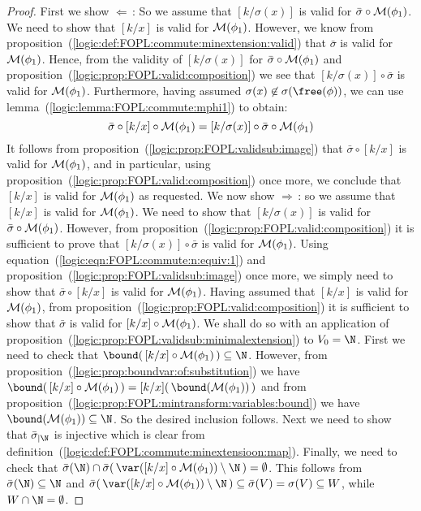 \begin{proof}
First we show $\Leftarrow$\,: So we assume that $[k/\sigma(x)]$ is
valid for $\bar{\sigma}\circ{\cal M}(\phi_{1})$. We need to show
that $[k/x]$ is valid for ${\cal M}(\phi_{1})$. However, we know
from proposition~(\ref{logic:def:FOPL:commute:minextension:valid})
that $\bar{\sigma}$ is valid for ${\cal M}(\phi_{1})$. Hence, from
the validity of $[k/\sigma(x)]$ for $\bar{\sigma}\circ{\cal
M}(\phi_{1})$ and
proposition~(\ref{logic:prop:FOPL:valid:composition}) we see that
$[k/\sigma(x)]\circ\bar{\sigma}$ is valid for ${\cal M}(\phi_{1})$.
Furthermore, having assumed $\sigma(x)\not\in\sigma(\free(\phi))$,
we can use lemma~(\ref{logic:lemma:FOPL:commute:mphi1}) to obtain:
    \begin{equation}\label{logic:eqn:FOPL:commute:n:equiv:1}
    \bar{\sigma}\circ [k/x]\circ{\cal
    M}(\phi_{1})= [k/\sigma(x)]\circ\bar{\sigma}\circ{\cal M}(\phi_{1})
    \end{equation}
It follows from proposition~(\ref{logic:prop:FOPL:validsub:image})
that $\bar{\sigma}\circ[k/x]$ is valid for ${\cal M}(\phi_{1})$, and
in particular, using
proposition~(\ref{logic:prop:FOPL:valid:composition}) once more, we
conclude that $[k/x]$ is valid for ${\cal M}(\phi_{1})$ as
requested. We now show $\Rightarrow$\,: so we assume that $[k/x]$ is
valid for ${\cal M}(\phi_{1})$. We need to show that $[k/\sigma(x)]$
is valid for $\bar{\sigma}\circ{\cal M}(\phi_{1})$. However, from
proposition~(\ref{logic:prop:FOPL:valid:composition}) it is
sufficient to prove that $[k/\sigma(x)]\circ\bar{\sigma}$ is valid
for ${\cal M}(\phi_{1})$. Using
equation~(\ref{logic:eqn:FOPL:commute:n:equiv:1}) and
proposition~(\ref{logic:prop:FOPL:validsub:image}) once more, we
simply need to show that $\bar{\sigma}\circ[k/x]$ is valid for
${\cal M}(\phi_{1})$. Having assumed that $[k/x]$ is valid for
${\cal M}(\phi_{1})$, from
proposition~(\ref{logic:prop:FOPL:valid:composition}) it is
sufficient to show that $\bar{\sigma}$ is valid for $[k/x]\circ{\cal
M}(\phi_{1})$. We shall do so with an application of
proposition~(\ref{logic:prop:FOPL:validsub:minimalextension}) to
$V_{0}=\N$. First we need to check that $\bound(\,[k/x]\circ{\cal
M}(\phi_{1})\,)\subseteq\N$. However, from
proposition~(\ref{logic:prop:boundvar:of:substitution}) we have
$\bound(\,[k/x]\circ{\cal M}(\phi_{1})\,) = [k/x](\,\bound({\cal
M}(\phi_{1}))\,)$ and from
proposition~(\ref{logic:prop:FOPL:mintransform:variables:bound}) we
have $\bound({\cal M}(\phi_{1}))\subseteq\N$. So the desired
inclusion follows. Next we need to show that $\bar{\sigma}_{|\N}$ is
injective which is clear from
definition~(\ref{logic:def:FOPL:commute:minextensioon:map}).
Finally, we need to check that
$\bar{\sigma}(\N)\cap\bar{\sigma}(\,\var([k/x]\circ{\cal
M}(\phi_{1}))\setminus\N\,)=\emptyset$. This follows from
$\bar{\sigma}(\N)\subseteq\N$ and
$\bar{\sigma}(\,\var([k/x]\circ{\cal
M}(\phi_{1}))\setminus\N\,)\subseteq\bar{\sigma}(V)=\sigma(V)\subseteq
W$, while $W\cap\N = \emptyset$.
\end{proof}


